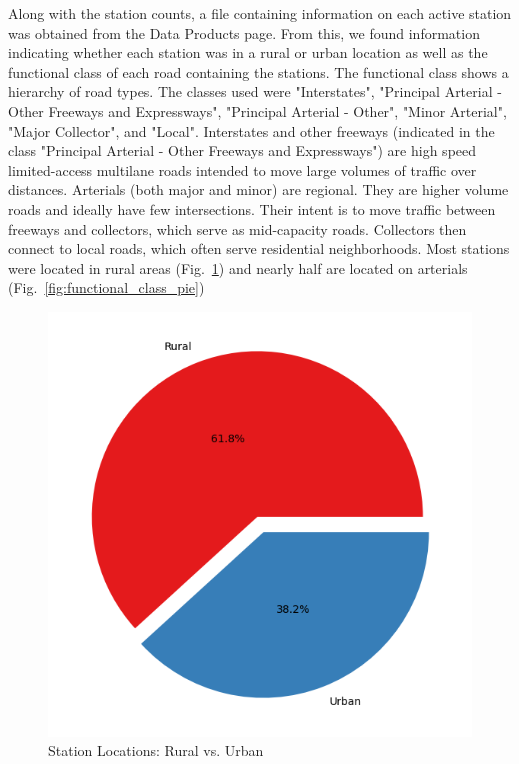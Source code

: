\documentclass[9pt,twocolumn,twoside, lineno]{jost-new}
\numberwithin{subsection}{section}
\begin{document}
Along with the station counts, a file containing information on each active station was obtained from the Data Products page.
From this, we found information indicating whether each station was in a rural or urban location as well as the functional class of each road containing the stations.
The functional class shows a hierarchy of road types.
The classes used were "Interstates", "Principal Arterial - Other Freeways and Expressways", "Principal Arterial - Other", "Minor Arterial", "Major Collector", and "Local".
Interstates and other freeways (indicated in the class "Principal Arterial - Other Freeways and Expressways") are high speed limited-access multilane roads intended to move large volumes of traffic over distances.
Arterials (both major and minor) are regional.
They are higher volume roads and ideally have few intersections.
Their intent is to move traffic between freeways and collectors, which serve as mid-capacity roads.
Collectors then connect to local roads, which often serve residential neighborhoods.
Most stations were located in rural areas (Fig.~\ref{fig:urban_rural_pie}) and nearly half are located on arterials (Fig.~\ref{fig:functional_class_pie})
\begin{figure}[h!]
\centering
\includegraphics[width=\linewidth]{figures/urban_rural_pie.png}
\caption{Station Locations: Rural vs. Urban}
\label{fig:urban_rural_pie}
\end{figure}
\end{document}
